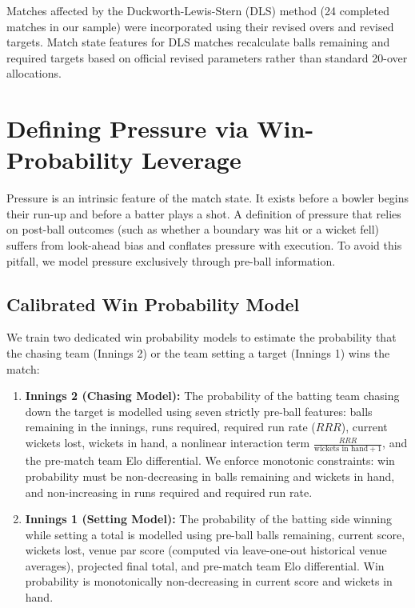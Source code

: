 \documentclass[11pt,a4paper]{article}
\begin{document}
Matches affected by the Duckworth-Lewis-Stern (DLS) method (24 completed matches in our sample) were incorporated using their revised overs and revised targets. Match state features for DLS matches recalculate balls remaining and required targets based on official revised parameters rather than standard 20-over allocations.

\section{Defining Pressure via Win-Probability Leverage}
\label{sec:pressure}

Pressure is an intrinsic feature of the match state. It exists before a bowler begins their run-up and before a batter plays a shot. A definition of pressure that relies on post-ball outcomes (such as whether a boundary was hit or a wicket fell) suffers from look-ahead bias and conflates pressure with execution. To avoid this pitfall, we model pressure exclusively through pre-ball information.

\subsection{Calibrated Win Probability Model}
We train two dedicated win probability models to estimate the probability that the chasing team (Innings 2) or the team setting a target (Innings 1) wins the match:
\begin{enumerate}
    \item \textbf{Innings 2 (Chasing Model):} The probability of the batting team chasing down the target is modelled using seven strictly pre-ball features: balls remaining in the innings, runs required, required run rate ($RRR$), current wickets lost, wickets in hand, a nonlinear interaction term $\frac{RRR}{\text{wickets in hand} + 1}$, and the pre-match team Elo differential. We enforce monotonic constraints: win probability must be non-decreasing in balls remaining and wickets in hand, and non-increasing in runs required and required run rate.
    \item \textbf{Innings 1 (Setting Model):} The probability of the batting side winning while setting a total is modelled using pre-ball balls remaining, current score, wickets lost, venue par score (computed via leave-one-out historical venue averages), projected final total, and pre-match team Elo differential. Win probability is monotonically non-decreasing in current score and wickets in hand.
\end{enumerate}
\end{document}
